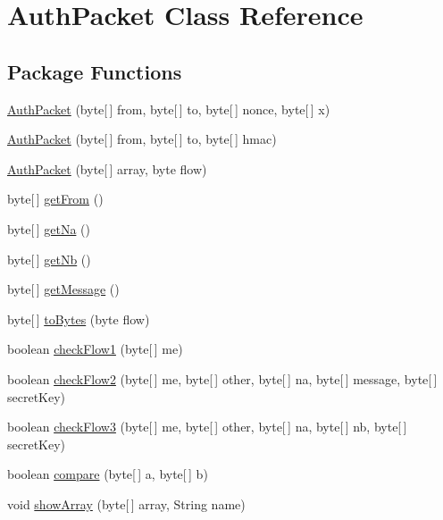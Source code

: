 \hypertarget{class_auth_packet}{
\section{Auth\-Packet Class Reference}
\label{class_auth_packet}
}
\subsection*{Package Functions}
\begin{CompactItemize}
\item 
\hyperlink{class_auth_packet_c0}{Auth\-Packet} (byte\mbox{[}$\,$\mbox{]} from, byte\mbox{[}$\,$\mbox{]} to, byte\mbox{[}$\,$\mbox{]} nonce, byte\mbox{[}$\,$\mbox{]} x)
\item 
\hyperlink{class_auth_packet_c1}{Auth\-Packet} (byte\mbox{[}$\,$\mbox{]} from, byte\mbox{[}$\,$\mbox{]} to, byte\mbox{[}$\,$\mbox{]} hmac)
\item 
\hyperlink{class_auth_packet_c2}{Auth\-Packet} (byte\mbox{[}$\,$\mbox{]} array, byte flow)
\item 
byte\mbox{[}$\,$\mbox{]} \hyperlink{class_auth_packet_c3}{get\-From} ()
\item 
byte\mbox{[}$\,$\mbox{]} \hyperlink{class_auth_packet_c4}{get\-Na} ()
\item 
byte\mbox{[}$\,$\mbox{]} \hyperlink{class_auth_packet_c5}{get\-Nb} ()
\item 
byte\mbox{[}$\,$\mbox{]} \hyperlink{class_auth_packet_c6}{get\-Message} ()
\item 
byte\mbox{[}$\,$\mbox{]} \hyperlink{class_auth_packet_c7}{to\-Bytes} (byte flow)
\item 
boolean \hyperlink{class_auth_packet_c8}{check\-Flow1} (byte\mbox{[}$\,$\mbox{]} me)
\item 
boolean \hyperlink{class_auth_packet_c9}{check\-Flow2} (byte\mbox{[}$\,$\mbox{]} me, byte\mbox{[}$\,$\mbox{]} other, byte\mbox{[}$\,$\mbox{]} na, byte\mbox{[}$\,$\mbox{]} message, byte\mbox{[}$\,$\mbox{]} secret\-Key)
\item 
boolean \hyperlink{class_auth_packet_c10}{check\-Flow3} (byte\mbox{[}$\,$\mbox{]} me, byte\mbox{[}$\,$\mbox{]} other, byte\mbox{[}$\,$\mbox{]} na, byte\mbox{[}$\,$\mbox{]} nb, byte\mbox{[}$\,$\mbox{]} secret\-Key)
\item 
boolean \hyperlink{class_auth_packet_c11}{compare} (byte\mbox{[}$\,$\mbox{]} a, byte\mbox{[}$\,$\mbox{]} b)
\item 
void \hyperlink{class_auth_packet_c12}{show\-Array} (byte\mbox{[}$\,$\mbox{]} array, String name)
\end{CompactItemize}


